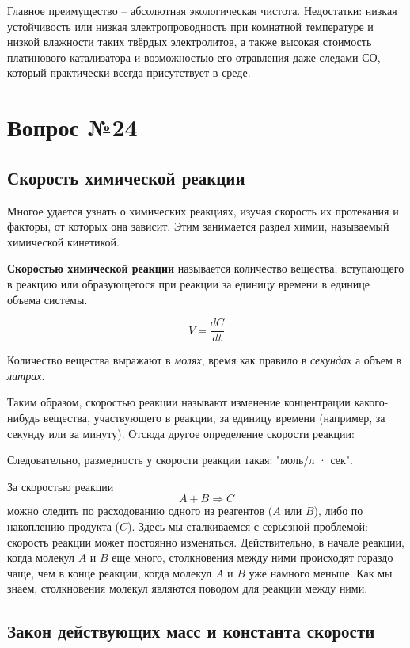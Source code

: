 \documentclass[14pt,a4paper]{scrartcl}
\begin{document}
Главное преимущество – абсолютная экологическая чистота. Недостатки: низкая устойчивость или низкая электропроводность при комнатной температуре и низкой влажности таких твёрдых электролитов, а также высокая стоимость платинового катализатора и возможностью его отравления даже следами СО, который практически всегда присутствует в среде.

\section*{Вопрос №24}

\subsection*{Скорость химической реакции}

Многое удается узнать о химических реакциях, изучая скорость их протекания и факторы, от которых она зависит. Этим занимается раздел химии, называемый химической кинетикой.

\textbf{Скоростью химической реакции} называется количество вещества, вступающего в реакцию или образующегося при реакции за единицу времени в единице объема системы.

$$V = \frac {dC}{dt}$$

Количество вещества выражают в \emph{молях}, время как правило в \emph{секундах} а объем в \emph{литрах}.

Таким образом, скоростью реакции называют изменение концентрации какого-нибудь вещества, участвующего в реакции, за единицу времени (например, за секунду или за минуту). Отсюда другое определение скорости реакции:

Следовательно, размерность у скорости реакции такая: "моль/л · сек".

За скоростью реакции $$A + B \Rightarrow C$$ можно следить по расходованию одного из реагентов ($A$ или $B$), либо по накоплению продукта ($C$). Здесь мы сталкиваемся с серьезной проблемой: скорость реакции может постоянно изменяться. Действительно, в начале реакции, когда молекул $A$ и $B$ еще много, столкновения между ними происходят гораздо чаще, чем в конце реакции, когда молекул $A$ и $B$ уже намного меньше. Как мы знаем, столкновения молекул являются поводом для реакции между ними. 

\subsection*{Закон действующих масс и константа скорости} 
\end{document}
